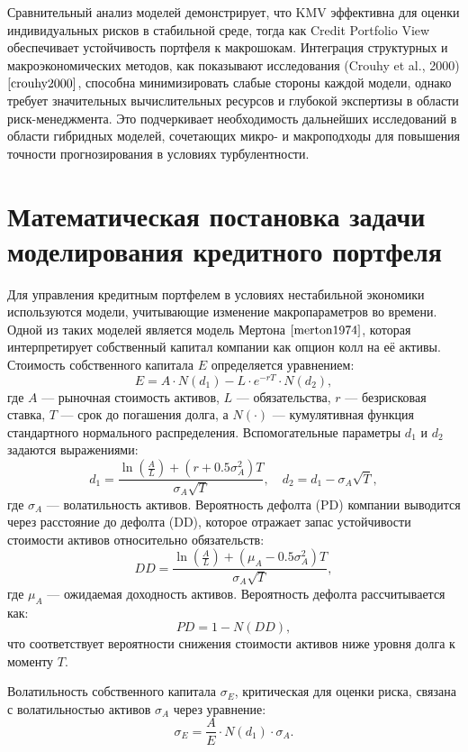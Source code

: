 \documentclass[]{article}
\begin{document}
	Сравнительный анализ моделей демонстрирует, что KMV эффективна для оценки индивидуальных рисков в стабильной среде, тогда как Credit Portfolio View обеспечивает устойчивость портфеля к макрошокам. Интеграция структурных и макроэкономических методов, как показывают исследования (Crouhy et al., 2000)$\cite{crouhy2000}$, способна минимизировать слабые стороны каждой модели, однако требует значительных вычислительных ресурсов и глубокой экспертизы в области риск-менеджмента. Это подчеркивает необходимость дальнейших исследований в области гибридных моделей, сочетающих микро- и макроподходы для повышения точности прогнозирования в условиях турбулентности.
	
	
	\section{Математическая постановка задачи моделирования кредитного портфеля}
	

	Для управления кредитным портфелем в условиях нестабильной экономики используются модели, учитывающие изменение макропараметров во времени. Одной из таких моделей является модель Мертона $\cite{merton1974}$, которая интерпретирует собственный капитал компании как опцион колл на её активы. Стоимость собственного капитала \(E\) определяется уравнением:  
	\[
	E = A \cdot N(d_1) - L \cdot e^{-rT} \cdot N(d_2),
	\]  
	где \(A\) — рыночная стоимость активов, \(L\) — обязательства, \(r\) — безрисковая ставка, \(T\) — срок до погашения долга, а \(N(\cdot)\) — кумулятивная функция стандартного нормального распределения. Вспомогательные параметры \(d_1\) и \(d_2\) задаются выражениями:  
	\[
	d_1 = \frac{\ln\left(\frac{A}{L}\right) + \left(r + 0.5\sigma_A^2\right)T}{\sigma_A\sqrt{T}}, \quad d_2 = d_1 - \sigma_A\sqrt{T},
	\]  
	где \(\sigma_A\) — волатильность активов. Вероятность дефолта (PD) компании выводится через расстояние до дефолта (DD), которое отражает запас устойчивости стоимости активов относительно обязательств:  
	\[
	DD = \frac{\ln \left( \frac{A}{L} \right) + (\mu_A - 0.5\sigma_A^2)T}{\sigma_A\sqrt{T}},
	\]  
	где \(\mu_A\) — ожидаемая доходность активов. Вероятность дефолта рассчитывается как:  
	\[
	PD = 1 - N(DD),
	\]  
	что соответствует вероятности снижения стоимости активов ниже уровня долга к моменту \(T\).  
	
	Волатильность собственного капитала \(\sigma_E\), критическая для оценки риска, связана с волатильностью активов \(\sigma_A\) через уравнение:  
	\[
	\sigma_E = \frac{A}{E} \cdot N(d_1) \cdot \sigma_A.
	\]  
	
\end{document}
